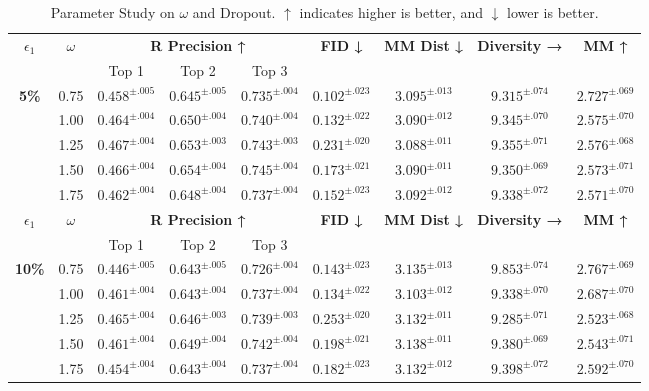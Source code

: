 \documentclass[a4paper,12pt]{article}
\begin{document}
\begin{table}[t]
\begin{tabular}{cc|ccc|c|c|c|c}
\multirow{2}{*}{\textbf{$\epsilon_1$}}& \multirow{2}{*}{\textbf{$\omega$}} & \multicolumn{3}{c|}{\textbf{R Precision ↑}} & \multirow{2}{*}{\textbf{FID ↓}} & \multirow{2}{*}{\textbf{MM Dist ↓}} & \multirow{2}{*}{\textbf{Diversity →}} & \multirow{2}{*}{\textbf{MM ↑}} \\
& & Top 1 & Top 2 & Top 3 &  &  &  & \\
\midrule

\multirow{5}{*}{\textbf{5\%}} 
& 0.75  & $0.458^{\pm.005}$ & $0.645^{\pm.005}$ & $0.735^{\pm.004}$ & $0.102^{\pm.023}$ & $3.095^{\pm.013}$ & $9.315^{\pm.074}$ & $2.727^{\pm.069}$ \\
& 1.00 & $0.464^{\pm.004}$ & $0.650^{\pm.004}$ & $0.740^{\pm.004}$ & $0.132^{\pm.022}$ & $3.090^{\pm.012}$ & $9.345^{\pm.070}$ & $2.575^{\pm.070}$ \\
& 1.25  & $0.467^{\pm.004}$ & $0.653^{\pm.003}$ & $0.743^{\pm.003}$ & $0.231^{\pm.020}$ & $3.088^{\pm.011}$ & $9.355^{\pm.071}$ & $2.576^{\pm.068}$ \\
& 1.50 & $0.466^{\pm.004}$ & $0.654^{\pm.004}$ & $0.745^{\pm.004}$ & $0.173^{\pm.021}$ & $3.090^{\pm.011}$ & $9.350^{\pm.069}$ & $2.573^{\pm.071}$ \\
& 1.75  & $0.462^{\pm.004}$ & $0.648^{\pm.004}$ & $0.737^{\pm.004}$ & $0.152^{\pm.023}$ & $3.092^{\pm.012}$ & $9.338^{\pm.072}$ & $2.571^{\pm.070}$ \\ \midrule

\multirow{2}{*}{\textbf{$\epsilon_1$}}& \multirow{2}{*}{\textbf{$\omega$}} & \multicolumn{3}{c|}{\textbf{R Precision ↑}} & \multirow{2}{*}{\textbf{FID ↓}} & \multirow{2}{*}{\textbf{MM Dist ↓}} & \multirow{2}{*}{\textbf{Diversity →}} & \multirow{2}{*}{\textbf{MM ↑}} \\
& & Top 1 & Top 2 & Top 3 &  &  &  & \\
\midrule

\multirow{5}{*}{\textbf{10\%}} 
& 0.75  & $0.446^{\pm.005}$ & $0.643^{\pm.005}$ & $0.726^{\pm.004}$ & $0.143^{\pm.023}$ & $3.135^{\pm.013}$ & $9.853^{\pm.074}$ & $2.767^{\pm.069}$ \\
& 1.00 & $0.461^{\pm.004}$ & $0.643^{\pm.004}$ & $0.737^{\pm.004}$ & $0.134^{\pm.022}$ & $3.103^{\pm.012}$ & $9.338^{\pm.070}$ & $2.687^{\pm.070}$ \\
& 1.25  & $0.465^{\pm.004}$ & $0.646^{\pm.003}$ & $0.739^{\pm.003}$ & $0.253^{\pm.020}$ & $3.132^{\pm.011}$ & $9.285^{\pm.071}$ & $2.523^{\pm.068}$ \\
& 1.50 & $0.461^{\pm.004}$ & $0.649^{\pm.004}$ & $0.742^{\pm.004}$ & $0.198^{\pm.021}$ & $3.138^{\pm.011}$ & $9.380^{\pm.069}$ & $2.543^{\pm.071}$ \\
& 1.75  & $0.454^{\pm.004}$ & $0.643^{\pm.004}$ & $0.737^{\pm.004}$ & $0.182^{\pm.023}$ & $3.132^{\pm.012}$ & $9.398^{\pm.072}$ & $2.592^{\pm.070}$ \\

\bottomrule
\end{tabular}
\caption{Parameter Study on $\omega$ and Dropout. $\uparrow$ indicates higher is better, and $\downarrow$ lower is better.}
\label{tab:Hyperparameters_2}
\end{table}
\end{document}
